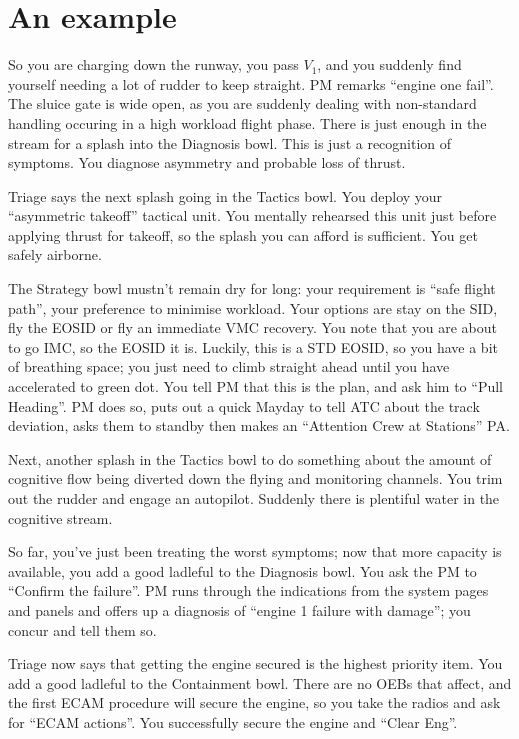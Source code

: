 \documentclass[a5paper,11pt,titlepage]{article}
\begin{document}
\section{An example}

So you are charging down the runway, you pass $V_1$, and you suddenly
find yourself needing a lot of rudder to keep straight. PM remarks
``engine one fail''. The sluice gate is wide open, as you are suddenly
dealing with non-standard handling occuring in a high workload flight
phase. There is just enough in the stream for a splash into the
Diagnosis bowl. This is just a recognition of symptoms. You diagnose
asymmetry and probable loss of thrust.

Triage says the next splash going in the Tactics bowl. You deploy your
``asymmetric takeoff'' tactical unit. You mentally rehearsed this unit
just before applying thrust for takeoff, so the splash you can afford is
sufficient. You get safely airborne.

The Strategy bowl mustn't remain dry for long: your requirement is
``safe flight path'', your preference to minimise workload. Your options
are stay on the SID, fly the EOSID or fly an immediate VMC recovery. You
note that you are about to go IMC, so the EOSID it is. Luckily, this is
a STD EOSID, so you have a bit of breathing space; you just need to
climb straight ahead until you have accelerated to green dot. You tell
PM that this is the plan, and ask him to ``Pull Heading''. PM does so,
puts out a quick Mayday to tell ATC about the track deviation, asks them
to standby then makes an ``Attention Crew at Stations'' PA.

Next, another splash in the Tactics bowl to do something about the
amount of cognitive flow being diverted down the flying and monitoring
channels. You trim out the rudder and engage an autopilot. Suddenly
there is plentiful water in the cognitive stream.

So far, you've just been treating the worst symptoms; now that more
capacity is available, you add a good ladleful to the Diagnosis bowl.
You ask the PM to ``Confirm the failure''. PM runs through the
indications from the system pages and panels and offers up a diagnosis of
``engine 1 failure with damage''; you concur and tell them so.

Triage now says that getting the engine secured is the highest priority
item. You add a good ladleful to the Containment bowl. There are no OEBs
that affect, and the first ECAM procedure will secure the engine, so you
take the radios and ask for ``ECAM actions''. You successfully secure
the engine and ``Clear Eng''.
\end{document}
